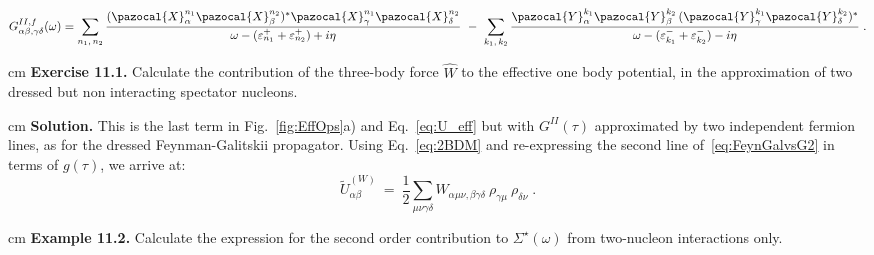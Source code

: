 \begin{equation}
G^{II,f}_{\alpha \beta, \gamma \delta}(\omega) =
\sum_{n_1, \, n_2} \frac{(\pazocal{X}^{n_1}_\alpha \pazocal{X}^{n_2}_\beta)^*  \pazocal{X}^{n_1}_\gamma \pazocal{X}^{n_2}_\delta}
                      {\omega  - (\varepsilon^+_{n_1}  + \varepsilon^+_{n_2}) + i\eta} 
~-~ \sum_{k_1, \, k_2} \frac{\pazocal{Y}^{k_1}_\alpha \pazocal{Y}^{k_2}_\beta \, (\pazocal{Y}^{k_1}_\gamma \pazocal{Y}^{k_2}_\delta)^*}
                     {\omega  - (\varepsilon^-_{k_1} + \varepsilon^-_{k_2}) - i\eta}   \; .
\label{eq:GIIf}
\end{equation}




 cm
\noindent
{\bf Exercise 11.1.} Calculate the contribution of the three-body force $\widehat W$ to the  effective one body potential, in the approximation of 
two dressed but non interacting spectator nucleons.

 cm
\noindent
{\bf Solution.}  This is the last term in Fig.~\ref{fig:EffOps}a) and Eq.~\eqref{eq:U_eff} but with $G^{II}(\tau)$ approximated by two independent fermion lines, as for the dressed Feynman-Galitskii propagator. Using Eq.~\eqref{eq:2BDM} and re-expressing the second line of~\eqref{eq:FeynGalvsG2} in terms of $g(\tau)$, we arrive at:
\begin{equation}
\label{eq:ueff_3b_first}
 \widetilde{U}^{(W)}_{\alpha\beta} ~=~ \frac{1}{2} \sum_{\mu \nu \gamma \delta}W_{\alpha\mu\nu,\beta\gamma\delta}
               ~\rho_{\gamma\mu}~\rho_{\delta\nu}  \; .
\end{equation}


 cm
\noindent
{\bf Example 11.2.} Calculate the expression for the second order contribution to $\Sigma^\star(\omega)$ from two-nucleon interactions only.


